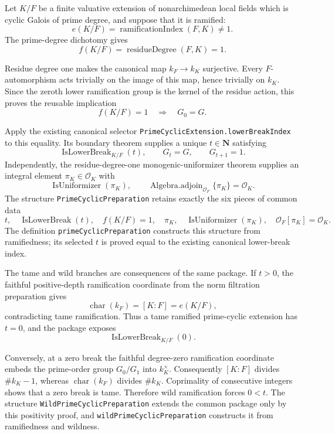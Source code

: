 \begin{theorem}
\label{mod:ramification-primecyclicpreparation}
Let $K/F$ be a finite valuative extension of nonarchimedean local fields
which is cyclic Galois of prime degree, and suppose that it is ramified:
\[
 e(K/F)=\operatorname{ramificationIndex}(F,K)\ne 1.
\]
The prime-degree dichotomy gives
\[
 f(K/F)=\operatorname{residueDegree}(F,K)=1.
\]

Residue degree one makes the canonical map $k_F\to k_K$ surjective. Every
$F$-automorphism acts trivially on the image of this map, hence trivially on
$k_K$. Since the zeroth lower ramification group is the kernel of the
residue action, this proves the reusable implication
\[
 f(K/F)=1\quad\Longrightarrow\quad G_0=G.
\]

Apply the existing canonical selector
\texttt{PrimeCyclicExtension.lowerBreakIndex} to this equality. Its
boundary theorem supplies a unique $t\in\mathbf N$ satisfying
\[
 \operatorname{IsLowerBreak}_{K/F}(t),\qquad
 G_t=G,\qquad G_{t+1}=1.
\]
Independently, the residue-degree-one monogenic-uniformizer theorem supplies
an integral element $\pi_K\in\mathcal O_K$ with
\[
 \operatorname{IsUniformizer}(\pi_K),\qquad
 \operatorname{Algebra.adjoin}_{\mathcal O_F}\{\pi_K\}
   =\mathcal O_K.
\]
The structure \texttt{PrimeCyclicPreparation} retains exactly the six pieces
of common data
\[
 t,\quad \operatorname{IsLowerBreak}(t),\quad f(K/F)=1,
 \quad \pi_K,\quad \operatorname{IsUniformizer}(\pi_K),
 \quad \mathcal O_F[\pi_K]=\mathcal O_K.
\]
The definition \texttt{primeCyclicPreparation} constructs this structure
from ramifiedness; its selected $t$ is proved equal to the existing canonical
lower-break index.

The tame and wild branches are consequences of the same package. If
$t>0$, the faithful positive-depth ramification coordinate from the norm
filtration preparation gives
\[
 \operatorname{char}(k_F)=[K:F]=e(K/F),
\]
contradicting tame ramification. Thus a tame ramified prime-cyclic
extension has $t=0$, and the package exposes
\[
 \operatorname{IsLowerBreak}_{K/F}(0).
\]

Conversely, at a zero break the faithful degree-zero ramification coordinate
embeds the prime-order group $G_0/G_1$ into $k_K^\times$. Consequently
$[K:F]$ divides $\#k_K-1$, whereas $\operatorname{char}(k_F)$ divides
$\#k_K$. Coprimality of consecutive integers shows that a zero break is
tame. Therefore wild ramification forces $0<t$. The structure
\texttt{WildPrimeCyclicPreparation} extends the common package only by this
positivity proof, and \texttt{wildPrimeCyclicPreparation} constructs it from
ramifiedness and wildness.


\end{theorem}
